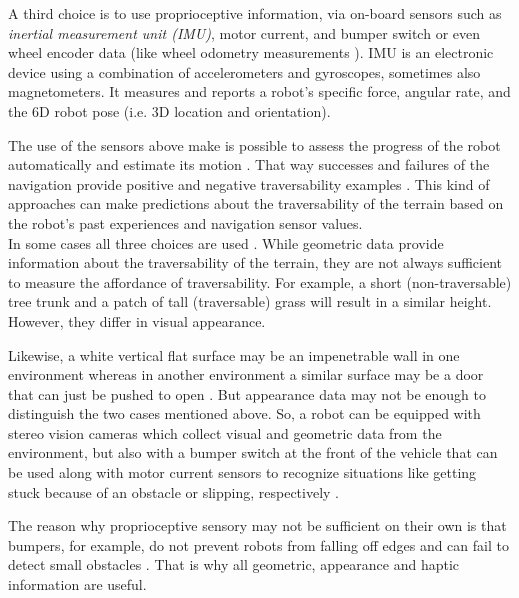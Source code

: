 \documentclass[12pt,a4paper,table,dvipsnames,tikz]{report}
\newcommand{\term}{\textit}
\newcommand{\acronym}{\MakeUppercase}
\begin{document}
	A third choice is to use proprioceptive information, via on-board sensors such 
	as \term{inertial measurement unit (\acronym{imu})}, motor current, and bumper 
	switch \citep{Kim} or even wheel encoder data \citep{Lee} (like wheel odometry 
	measurements \citep{Droeschel}). \acronym{imu} is an electronic device using 
	a combination of accelerometers and gyroscopes, sometimes also magnetometers. 
	It measures and reports a robot's specific force, angular rate, and the 
	\acronym{6d} robot pose (i.e. \acronym{3d} location and orientation).
	\par
	The use of the sensors above make is possible to assess the progress of the 
	robot automatically and estimate its motion \citep{Droeschel}. That way successes 
	and failures of the navigation provide positive and negative traversability 
	examples \citep{Kim}. This kind of approaches can make predictions about the 
	traversability of the terrain based on the robot's past experiences and 
	navigation sensor values.
	\\
	
	In some cases all three choices are used \citep{Kim, Shneier}. While geometric 
	data provide information about the traversability of the terrain, they are 
	not always sufficient to measure the affordance of traversability. For 
	example, a short (non-traversable) tree trunk and a patch of tall (traversable) 
	grass will result in a similar height. However, they differ in visual 
	appearance. 
	\par 
	Likewise, a white vertical flat surface may be an impenetrable wall in one 
	environment whereas in another environment a similar surface may be a door that 
	can just be pushed to open \citep{Ugur}. But appearance data may not be enough 
	to distinguish the two cases mentioned above. So, a robot can be equipped with 
	stereo vision cameras which collect visual and geometric data from the 
	environment, but also with a bumper switch at the front of the vehicle that can 
	be used along with motor current sensors to recognize situations like getting 
	stuck because of an obstacle or slipping, respectively \citep{Kim}.
	\par
	The reason why proprioceptive sensory may not be sufficient on their own is that 
	bumpers, for example, do not prevent robots from falling off edges and can fail 
	to detect small obstacles \citep{HiroseGonet}. That is why all geometric, 
	appearance and haptic information are useful.
	\\\\
	
\end{document}

